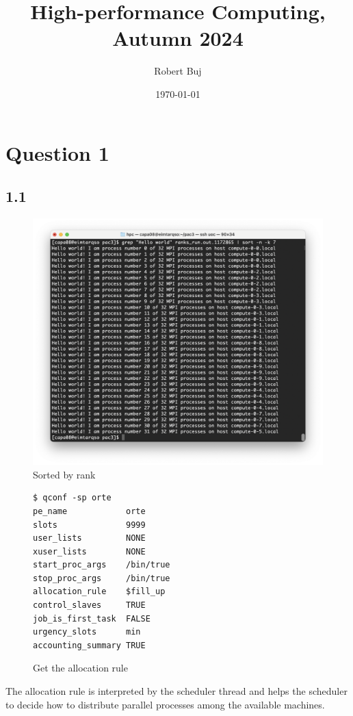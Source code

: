 \documentclass[12pt]{article}
\title{High-performance Computing, Autumn 2024}
\author{Robert Buj}
\date{\today}
\begin{document}
\maketitle

\section*{Question 1}

\subsection*{1.1}

\begin{figure}[h!]
	\centering
	\includegraphics[width=0.8\linewidth]{images/Q1.1.png}
	\caption{Sorted by rank}
	\label{fig:Q1A}
\end{figure}

\newpage

\begin{figure}[h!]
	\begin{verbatim}
$ qconf -sp orte
pe_name            orte
slots              9999
user_lists         NONE
xuser_lists        NONE
start_proc_args    /bin/true
stop_proc_args     /bin/true
allocation_rule    $fill_up
control_slaves     TRUE
job_is_first_task  FALSE
urgency_slots      min
accounting_summary TRUE
	\end{verbatim}
\caption{Get the allocation rule}\label{code:qconf}
\end{figure}

The allocation rule is interpreted by the scheduler thread and helps the scheduler to decide how to distribute parallel processes among the available machines.
\end{document}
